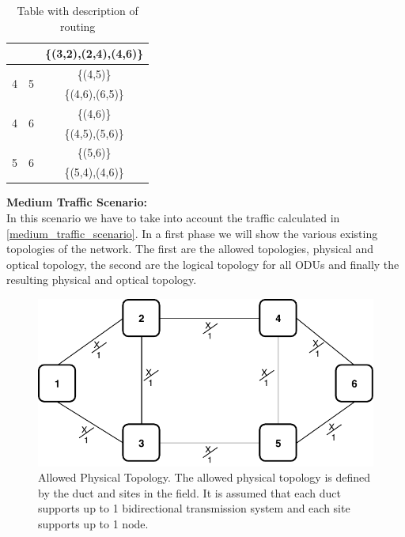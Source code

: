 \begin{table}[h!]
\begin{tabular}{|| c | c | c ||}
 & & \{(3,2),(2,4),(4,6)\} \\ \hline
 \multirow{2}{*}{4} & \multirow{2}{*}{5} & \{(4,5)\}\\
 & & \{(4,6),(6,5)\} \\ \hline
 \multirow{2}{*}{4} & \multirow{2}{*}{6} & \{(4,6)\}\\
 & & \{(4,5),(5,6)\} \\ \hline
 \multirow{2}{*}{5} & \multirow{2}{*}{6} & \{(5,6)\}\\
 & & \{(5,4),(4,6)\} \\
 \hline
\end{tabular}
\caption{Table with description of routing}
\label{path_opaque_protec_ref_low}
\end{table}

\vspace{17pt}
\textbf{Medium Traffic Scenario:}\\

In this scenario we have to take into account the traffic calculated in \ref{medium_traffic_scenario}. In a first phase we will show the various existing topologies of the network. The first are the allowed topologies, physical and optical topology, the second are the logical topology for all ODUs and finally the resulting physical and optical topology.\\

\begin{figure}[h!]
\centering
\includegraphics[width=13cm]{sdf/ilp/opaque_protection/figures/allowed_physical_topology}
\caption{Allowed Physical Topology. The allowed physical topology is defined by the duct and sites in the field. It is assumed that each duct supports up to 1 bidirectional transmission system and each site supports up to 1 node.}
\label{allowed_physical_protectionmedium}
\end{figure}

\vspace{20pt}

